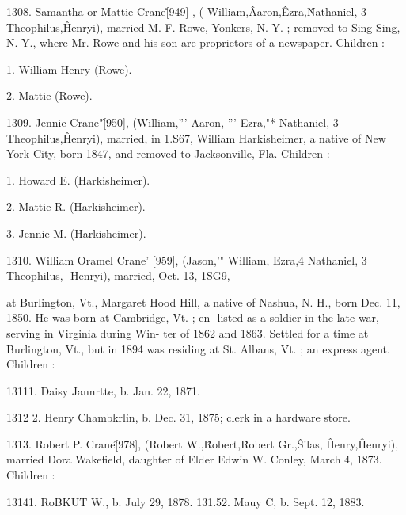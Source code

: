 1308. Samantha or Mattie Crane\^ [949] , ( William,\^ Aaron,\^ 
Ezra,\^ Nathaniel, 3 Theophilus,\^ Henryi), married M. F. Rowe, 
Yonkers, N. Y. ; removed to Sing Sing, N. Y., where Mr. Rowe 
and his son are proprietors of a newspaper. Children : 

1. William Henry (Rowe). 

2. Mattie (Rowe). 

1309. Jennie Crane"\^ [950], (William,''' Aaron, ''' Ezra,"* 
Nathaniel, 3 Theophilus,\^ Henryi), married, in 1.S67, William 
Harkisheimer, a native of New York City, born 1847, and 
removed to Jacksonville, Fla. Children : 

1. Howard E. (Harkisheimer). 

2. Mattie R. (Harkisheimer). 

3. Jennie M. (Harkisheimer). 

1310. William Oramel Crane' [959], (Jason,'" William,  
Ezra,4 Nathaniel, 3 Theophilus,- Henryi), married, Oct. 13, 1SG9, 




at Burlington, Vt., Margaret Hood Hill, a native of Nashua, N. 
H., born Dec. 11, 1850. He was born at Cambridge, Vt. ; en- 
listed as a soldier in the late war, serving in Virginia during Win- 
ter of 1862 and 1863. Settled for a time at Burlington, Vt., but 
in 1894 was residing at St. Albans, Vt. ; an express agent. 
Children : 

13111. Daisy Jannrtte, b. Jan. 22, 1871. 

1312  2. Henry Chambkrlin, b. Dec. 31, 1875; clerk in a hardware 
store. 

1313. Robert P. Crane\^ [978], (Robert W.,\^ Robert,\^ 
Robert Gr.,\^ Silas, \^ Henry,\^ Henryi), married Dora Wakefield, 
daughter of Elder Edwin W. Conley, March 4, 1873. Children : 

13141. RoBKUT W., b. July 29, 1878. 
131.52. Mauy C, b. Sept. 12, 1883. 

